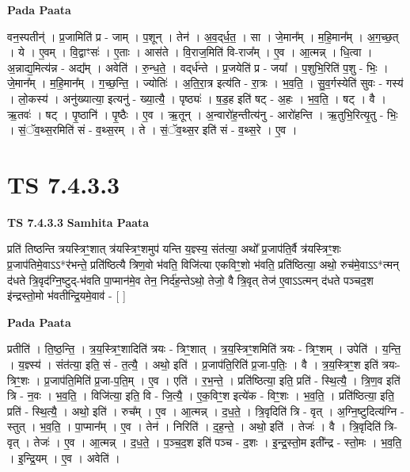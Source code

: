 \documentclass[17pt]{extarticle}
\begin{document}
\textbf{Pada Paata} \newline

वन॒स्पतीन्॑ । प्र॒जामिति॑ प्र - जाम् । प॒शून् । तेन॑ । अ॒व॒द्‌र्ध॒त॒ । सा । जे॒मान᳚म् । म॒हि॒मान᳚म् । अ॒ग॒च्छ॒त् । ये । ए॒वम् । वि॒द्वाꣳसः॑ । ए॒ताः । आस॑ते । वि॒राज॒मिति॑ वि-राज᳚म् । ए॒व । आ॒त्मन्न् । धि॒त्वा । अ॒न्नाद्य॒मित्य॑न्न - अद्य᳚म् । अवेति॑ । रु॒न्ध॒ते॒ । वद्‌र्ध॑न्ते । प्र॒जयेति॑ प्र - जया᳚ । प॒शुभि॒रिति॑ प॒शु - भिः॒ । जे॒मान᳚म् । म॒हि॒मान᳚म् । ग॒च्छ॒न्ति॒ । ज्योतिः॑ । अ॒ति॒रा॒त्र इत्य॑ति - रा॒त्रः । भ॒व॒ति॒ । सु॒व॒र्गस्येति॑ सुवः - गस्य॑ । लो॒कस्य॑ । अनु॑ख्यात्या॒ इत्यनु॑ - ख्या॒त्यै॒ । पृष्ठ्यः॑ । ष॒ड॒ह इति॑ षट् - अ॒हः । भ॒व॒ति॒ । षट् । वै । ऋ॒तवः॑ । षट् । पृ॒ष्ठानि॑ । पृ॒ष्ठैः । ए॒व । ऋ॒तून् । अ॒न्वारो॑ह॒न्तीत्य॑नु - आरो॑हन्ति । ऋ॒तुभि॒रित्यृ॒तु - भिः॒ । सं॒ॅव॒थ्स॒रमिति॑ सं - व॒थ्स॒रम् । ते । सं॒ॅव॒थ्स॒र इति॑ सं - व॒थ्स॒रे । ए॒व ।  \newline




\section*{ TS 7.4.3.3 }

\textbf{TS 7.4.3.3 } \newline
\textbf{Samhita Paata} \newline

प्रति॑ तिष्ठन्ति त्रयस्त्रिꣳ॒॒शात् त्र॑यस्त्रिꣳ॒॒शमुप॑ यन्ति य॒ज्ञ्स्य॒ संत॑त्या॒ अथो᳚ प्र॒जाप॑ति॒र्वै त्र॑यस्त्रिꣳ॒॒शः प्र॒जाप॑तिमे॒वाऽऽ*र॑भन्ते॒ प्रति॑ष्ठित्यै त्रिण॒वो भ॑वति॒ विजि॑त्या एकविꣳ॒॒शो भ॑वति॒ प्रति॑ष्ठित्या॒ अथो॒ रुच॑मे॒वाऽऽ*त्मन् द॑धते त्रि॒वृद॑ग्नि॒ष्टुद्-भ॑वति पा॒प्मान॑मे॒व तेन॒ निर्द॑ह॒न्तेऽथो॒ तेजो॒ वै त्रि॒वृत् तेज॑ ए॒वाऽऽत्मन् द॑धते पञ्चद॒श इ॑न्द्रस्तो॒मो भ॑वतीन्द्रि॒यमे॒वाव॑ - [  ] \newline

\textbf{Pada Paata} \newline

प्रतीति॑ । ति॒ष्ठ॒न्ति॒ । त्र॒य॒स्त्रिꣳ॒॒शादिति॑ त्रयः - त्रिꣳ॒॒शात् । त्र॒य॒स्त्रिꣳ॒॒शमिति॑ त्रयः - त्रिꣳ॒॒शम् । उपेति॑ । य॒न्ति॒ । य॒ज्ञ्स्य॑ । संत॑त्या॒ इति॒ सं - त॒त्यै॒ । अथो॒ इति॑ । प्र॒जाप॑ति॒रिति॑ प्र॒जा-प॒तिः॒ । वै । त्र॒य॒स्त्रिꣳ॒॒श इति॑ त्रयः-त्रिꣳ॒॒शः । प्र॒जाप॑ति॒मिति॑ प्र॒जा-प॒ति॒म् । ए॒व । एति॑ । र॒भ॒न्ते॒ । प्रति॑ष्ठित्या॒ इति॒ प्रति॑ - स्थि॒त्यै॒ । त्रि॒ण॒व इति॑ त्रि - न॒वः । भ॒व॒ति॒ । विजि॑त्या॒ इति॒ वि - जि॒त्यै॒ । ए॒क॒विꣳ॒॒श इत्ये॑क - विꣳ॒॒शः । भ॒व॒ति॒ । प्रति॑ष्ठित्या॒ इति॒ प्रति॑ - स्थि॒त्यै॒ । अथो॒ इति॑ । रुच᳚म् । ए॒व । आ॒त्मन्न् । द॒ध॒ते॒ । त्रि॒वृदिति॑ त्रि - वृत् । अ॒ग्नि॒ष्टुदित्य॑ग्नि - स्तुत् । भ॒व॒ति॒ । पा॒प्मान᳚म् । ए॒व । तेन॑ । निरिति॑ । द॒ह॒न्ते॒ । अथो॒ इति॑ । तेजः॑ । वै । त्रि॒वृदिति॑ त्रि-वृत् । तेजः॑ । ए॒व । आ॒त्मन्न् । द॒ध॒ते॒ । प॒ञ्च॒द॒श इति॑ पञ्च - द॒शः । इ॒न्द्र॒स्तो॒म इती᳚न्द्र - स्तो॒मः । भ॒व॒ति॒ । इ॒न्द्रि॒यम् । ए॒व । अवेति॑ ।  \newline
\end{document}
